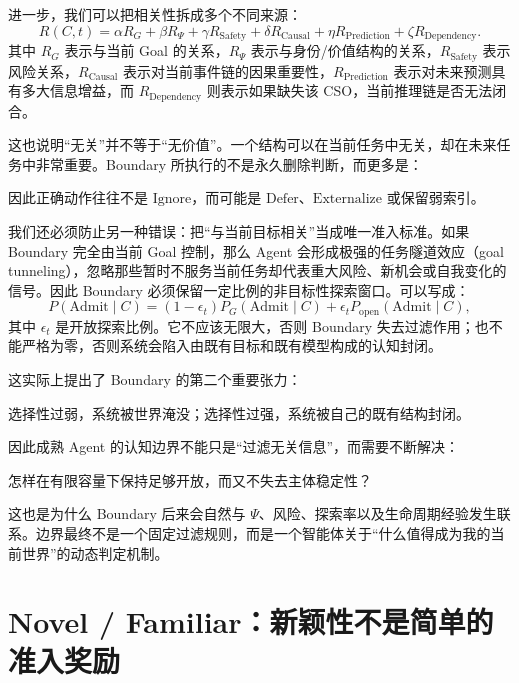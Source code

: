 进一步，我们可以把相关性拆成多个不同来源：
\[
R(C,t)
=
\alpha R_G
+
\beta R_{\Psi}
+
\gamma R_{\mathrm{Safety}}
+
\delta R_{\mathrm{Causal}}
+
\eta R_{\mathrm{Prediction}}
+
\zeta R_{\mathrm{Dependency}}.
\]
其中 $R_G$ 表示与当前 Goal 的关系，$R_{\Psi}$ 表示与身份/价值结构的关系，$R_{\mathrm{Safety}}$ 表示风险关系，$R_{\mathrm{Causal}}$ 表示对当前事件链的因果重要性，$R_{\mathrm{Prediction}}$ 表示对未来预测具有多大信息增益，而 $R_{\mathrm{Dependency}}$ 则表示如果缺失该 CSO，当前推理链是否无法闭合。

这也说明“无关”并不等于“无价值”。一个结构可以在当前任务中无关，却在未来任务中非常重要。Boundary 所执行的不是永久删除判断，而更多是：
\begin{statementbox}
\centering
{}
\end{statementbox}
因此正确动作往往不是 $\mathrm{Ignore}$，而可能是 $\mathrm{Defer}$、$\mathrm{Externalize}$ 或保留弱索引。

我们还必须防止另一种错误：把“与当前目标相关”当成唯一准入标准。如果 Boundary 完全由当前 Goal 控制，那么 Agent 会形成极强的任务隧道效应（goal tunneling），忽略那些暂时不服务当前任务却代表重大风险、新机会或自我变化的信号。因此 Boundary 必须保留一定比例的非目标性探索窗口。可以写成：
\[
P(\mathrm{Admit}\mid C)
=
(1-\epsilon_t)
P_G(\mathrm{Admit}\mid C)
+
\epsilon_t
P_{\mathrm{open}}(\mathrm{Admit}\mid C),
\]
其中 $\epsilon_t$ 是开放探索比例。它不应该无限大，否则 Boundary 失去过滤作用；也不能严格为零，否则系统会陷入由既有目标和既有模型构成的认知封闭。

这实际上提出了 Boundary 的第二个重要张力：
\begin{statementbox}
\centering
{}
\end{statementbox}
选择性过弱，系统被世界淹没；选择性过强，系统被自己的既有结构封闭。

因此成熟 Agent 的认知边界不能只是“过滤无关信息”，而需要不断解决：
\begin{remark}
怎样在有限容量下保持足够开放，而又不失去主体稳定性？
\end{remark}
这也是为什么 Boundary 后来会自然与 $\Psi$、风险、探索率以及生命周期经验发生联系。边界最终不是一个固定过滤规则，而是一个智能体关于“什么值得成为我的当前世界”的动态判定机制。


\section{Novel / Familiar：新颖性不是简单的准入奖励}

